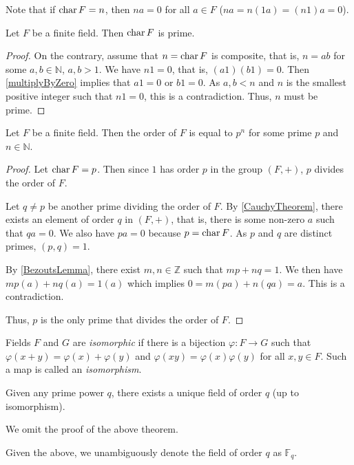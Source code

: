 Note that if $\operatorname{char} F=n$, then $na=0$ for all $a\in F$ ($na=n(1a)=(n1)a=0$).

\begin{theorem}
    Let $F$ be a finite field. Then $\operatorname{char} F$ is prime.
\end{theorem}
\begin{proof}
    On the contrary, assume that $n=\operatorname{char} F$ is composite, that is, $n=ab$ for some $a,b\in\mathbb{N}$, $a,b>1$. We have $n1=0$, that is, $(a1)(b1)=0$. Then \ref{multiplyByZero} implies that $a1=0$ or $b1=0$. As $a,b<n$ and $n$ is the smallest positive integer such that $n1=0$, this is a contradiction. Thus, $n$ must be prime.
\end{proof}

\begin{theorem}
    Let $F$ be a finite field. Then the order of $F$ is equal to $p^n$ for some prime $p$ and $n\in\mathbb{N}$.
\end{theorem}
\begin{proof}
    Let $\operatorname{char} F=p$. Then since $1$ has order $p$ in the group $(F,+)$, $p$ divides the order of $F$.
    
    \vspace{1mm}
    Let $q\neq p$ be another prime dividing the order of $F$. By \ref{CauchyTheorem}, there exists an element of order $q$ in $(F,+)$, that is, there is some non-zero $a$ such that $qa=0$. We also have $pa=0$ because $p = \operatorname{char} F$. As $p$ and $q$ are distinct primes, $(p,q)=1$.
    
    \vspace{1mm}
    By \ref{BezoutsLemma}, there exist $m,n\in\mathbb{Z}$ such that $mp+nq=1$. We then have $mp(a)+nq(a)=1(a)$ which implies $0=m(pa)+n(qa)=a$. This is a contradiction.
    
    \vspace{1mm}
    Thus, $p$ is the only prime that divides the order of $F$.
\end{proof}

\begin{definition}
    Fields $F$ and $G$ are \textit{isomorphic} if there is a bijection $\varphi:F\to G$ such that $\varphi(x+y)=\varphi(x)+\varphi(y)$ and $\varphi(xy)=\varphi(x)\varphi(y)$ for all $x,y\in F$. Such a map is called an \textit{isomorphism}.
\end{definition}

\begin{theorem}
    Given any prime power $q$, there exists a unique field of order $q$ (up to isomorphism).
\end{theorem}

We omit the proof of the above theorem.

\vspace{2mm}
Given the above, we unambiguously denote the field of order $q$ as $\mathbb{F}_q$.


\clearpage